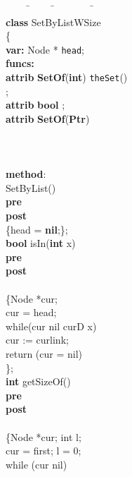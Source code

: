 \documentclass[fleqn]{llncs}
\begin{document}
\begin{figure}
\begin{center}
\begin{boxedminipage}{0.5\textwidth}
{\scriptsize
\begin{tabbing}
\ \ \ \ \=\ \ \ \ \ \=\ \ \ \ \ \ \ \ \=\ \ \ \ \=\\
\textbf{class} SetByListWSize\\
\{\\
\textbf{var:} Node * \texttt{head};\\
\textbf{funcs:}\\
    \>\textbf{attrib} \textbf{SetOf}(\textbf{int}) \texttt{theSet}()  \\
    \>  \>;\\
    \>\textbf{attrib} \textbf{bool} ;\\
    \>\textbf{attrib} \textbf{SetOf}(\textbf{Ptr}) \\
    \>  \>\\
    \>  \>\\
    \>  \>\\
\textbf{method}:\\
    \>SetByList()\\
    \>  \>\textbf{pre}  \\
    \>  \>\textbf{post} \\
    \>  \>\{head = \textbf{nil};\};\\
    \>\textbf{bool}  isIn(\textbf{int} x)\\
    \>  \>\textbf{pre} \\
    \>  \>\textbf{post} \\
    \>  \>  \>\\
    \>\{\>Node *cur;\\
    \>  \>  cur = head;\\
    \>  \>  while(cur  nil  cur\fldacc D  x)\\
    \>  \>  \>cur := cur\fldacc link;\\
    \>  \>return (cur = nil)\\
    \>\};\\
    \>\textbf{int}  getSizeOf()\\
    \>  \>\textbf{pre} \\
    \>  \>\textbf{post} \\
    \>  \>  \>\\
    \>\{\>Node *cur; int l;\\
    \>  \>cur = first; l = 0;\\
    \>  \>while (cur nil)\\

\end{tabbing}}
\end{boxedminipage}
\end{center}
\end{figure}
\end{document}
